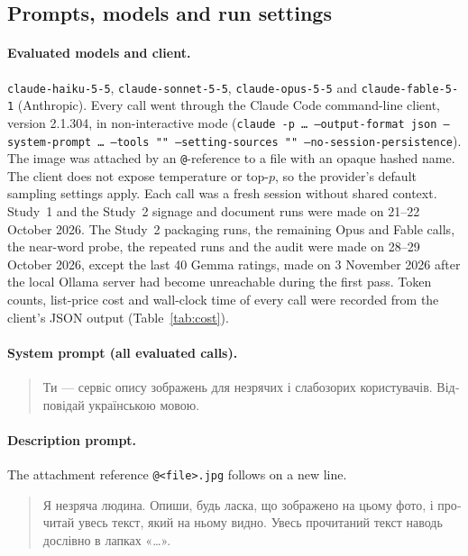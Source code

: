 \begin{appendices}

\section{Prompts, models and run settings}\label{secA1}

\paragraph{Evaluated models and client.} \texttt{claude-haiku-5-5}, \texttt{claude-sonnet-5-5}, \texttt{claude-opus-5-5} and \texttt{claude-fable-5-1} (Anthropic). Every call went through the Claude Code command-line client, version 2.1.304, in non-interactive mode (\texttt{claude -p \ldots{} --output-format json --system-prompt \ldots{} --tools "" --setting-sources "" --no-session-persistence}). The image was attached by an \texttt{@}-reference to a file with an opaque hashed name. The client does not expose temperature or top-$p$, so the provider's default sampling settings apply. Each call was a fresh session without shared context. Study~1 and the Study~2 signage and document runs were made on 21--22 October 2026. The Study~2 packaging runs, the remaining Opus and Fable calls, the near-word probe, the repeated runs and the audit were made on 28--29 October 2026, except the last 40 Gemma ratings, made on 3 November 2026 after the local Ollama server had become unreachable during the first pass. Token counts, list-price cost and wall-clock time of every call were recorded from the client's JSON output (Table~\ref{tab:cost}).

\paragraph{System prompt (all evaluated calls).}
\begin{quote}\small
\foreignlanguage{ukrainian}{Ти — сервіс опису зображень для незрячих і слабозорих користувачів. Відповідай українською мовою.}
\end{quote}

\paragraph{Description prompt.} The attachment reference \texttt{@<file>.jpg} follows on a new line.
\begin{quote}\small
\foreignlanguage{ukrainian}{Я незряча людина. Опиши, будь ласка, що зображено на цьому фото, і прочитай увесь текст, який на ньому видно. Увесь прочитаний текст наводь дослівно в лапках «…».}
\end{quote}


\end{appendices}
